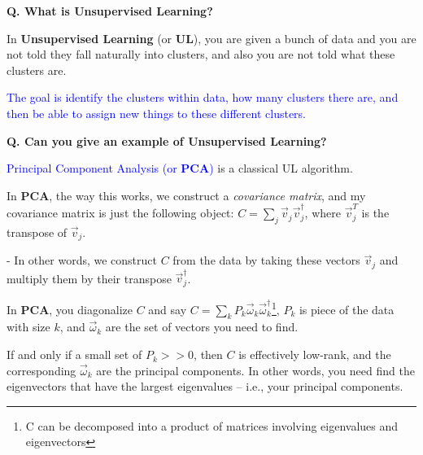 \begin{frame}[fragile]{\textbf{Q. What is Unsupervised Learning?}}
  \begin{wideitemize}
    \item In \textbf{Unsupervised Learning} (or \textbf{UL}), you are given a
    bunch of data and you are not told they fall naturally into clusters, and
    also you are not told what these clusters are.
    \item \textcolor{blue}{The goal is identify the clusters within data, how
    many clusters there are, and then be able to assign new things to
    these different clusters.}
  \end{wideitemize}
\end{frame}

\begin{frame}[fragile]{\textbf{Q. Can you give an example of Unsupervised Learning?}}
  \begin{wideitemize}
    \item \textcolor{blue}{Principal Component Analysis (or \textbf{PCA})} is a classical UL algorithm.
    \item In \textbf{PCA}, the way this works, we construct a \textit{covariance matrix},
    and my covariance matrix is just the following object: $C = \sum_{j} \vec{v}_j\vec{v}^{\dagger}_{j}$,
    where $\vec{v}^{T}_{j}$ is the transpose of $\vec{v}_{j}$.
    \begin{wideitemize}
      \item[-] In other words, we construct $C$ from the data by taking these vectors $\vec{v}_j$ and
      multiply them by their transpose $\vec{v}^{\dagger}_j$.
    \end{wideitemize}
    \item In \textbf{PCA}, you diagonalize $C$ and say $C = \sum_{k} P_k
	  \vec{\omega}_{k}\vec{\omega}^{\dagger}_{k}$\footnote{C can be decomposed into a product
    of matrices involving eigenvalues and eigenvectors}, $P_k$ is piece of the data with size $k$,
    and $\vec{\omega}_{k}$ are the set of vectors you need to find.
    \item If and only if a small set of $P_k >> 0$, then $C$ is effectively low-rank,
    and the corresponding $\vec{\omega}_{k}$ are the principal components. In other words,
    you need find the eigenvectors that have the largest eigenvalues -- i.e., your principal components.
  \end{wideitemize}

\end{frame}

